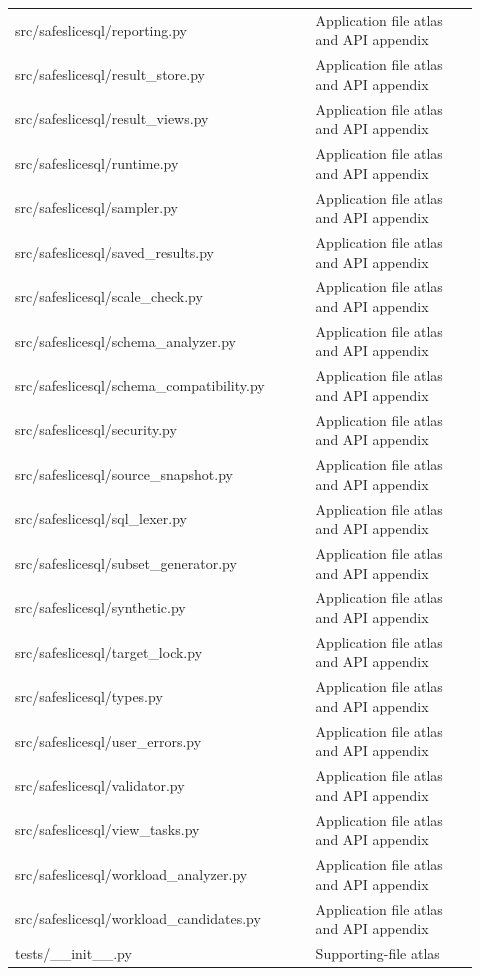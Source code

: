 \begin{longtable}{>{\raggedright\arraybackslash}p{0.598\linewidth}>{\raggedright\arraybackslash}p{0.322\linewidth}}
src/safeslicesql/reporting.py & Application file atlas and API appendix \\[4pt]
src/safeslicesql/result\_store.py & Application file atlas and API appendix \\[4pt]
src/safeslicesql/result\_views.py & Application file atlas and API appendix \\[4pt]
src/safeslicesql/runtime.py & Application file atlas and API appendix \\[4pt]
src/safeslicesql/sampler.py & Application file atlas and API appendix \\[4pt]
src/safeslicesql/saved\_results.py & Application file atlas and API appendix \\[4pt]
src/safeslicesql/scale\_check.py & Application file atlas and API appendix \\[4pt]
src/safeslicesql/schema\_analyzer.py & Application file atlas and API appendix \\[4pt]
src/safeslicesql/schema\_compatibility.py & Application file atlas and API appendix \\[4pt]
src/safeslicesql/security.py & Application file atlas and API appendix \\[4pt]
src/safeslicesql/source\_snapshot.py & Application file atlas and API appendix \\[4pt]
src/safeslicesql/sql\_lexer.py & Application file atlas and API appendix \\[4pt]
src/safeslicesql/subset\_generator.py & Application file atlas and API appendix \\[4pt]
src/safeslicesql/synthetic.py & Application file atlas and API appendix \\[4pt]
src/safeslicesql/target\_lock.py & Application file atlas and API appendix \\[4pt]
src/safeslicesql/types.py & Application file atlas and API appendix \\[4pt]
src/safeslicesql/user\_errors.py & Application file atlas and API appendix \\[4pt]
src/safeslicesql/validator.py & Application file atlas and API appendix \\[4pt]
src/safeslicesql/view\_tasks.py & Application file atlas and API appendix \\[4pt]
src/safeslicesql/workload\_analyzer.py & Application file atlas and API appendix \\[4pt]
src/safeslicesql/workload\_candidates.py & Application file atlas and API appendix \\[4pt]
tests/\_\_init\_\_.py & Supporting-file atlas \\[4pt]

\end{longtable}
